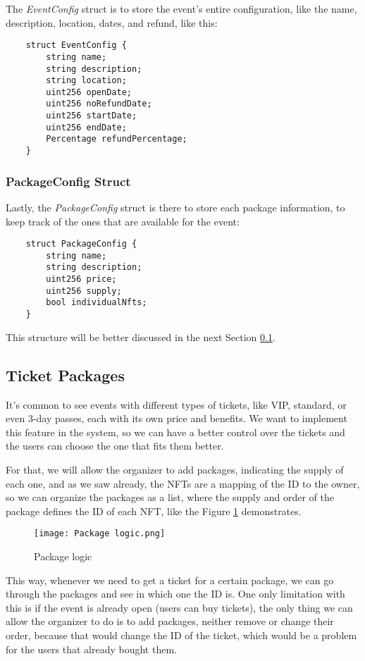 The \textit{EventConfig} struct is to store the event's entire configuration, like the name, description, location, dates, and refund, like this:
\begin{verbatim}
    struct EventConfig {
        string name;
        string description;
        string location;
        uint256 openDate;
        uint256 noRefundDate;
        uint256 startDate;
        uint256 endDate;
        Percentage refundPercentage;
    }
\end{verbatim}

\subsubsection{PackageConfig Struct}

Lastly, the \textit{PackageConfig} struct is there to store each package information, to keep track of the ones that are available for the event:
\begin{verbatim}
    struct PackageConfig {
        string name;
        string description;
        uint256 price;
        uint256 supply;
        bool individualNfts;
    }
\end{verbatim}
This structure will be better discussed in the next Section \ref{subsec:ticket_packages}.

\subsection{Ticket Packages}
\label{subsec:ticket_packages}

It's common to see events with different types of tickets, like VIP, standard, or even 3-day passes, each with its own price and benefits. We want to implement this feature in the system, so we can have a better control over the tickets and the users can choose the one that fits them better.

For that, we will allow the organizer to add packages, indicating the supply of each one, and as we saw already, the NFTs are a mapping of the ID to the owner, so we can organize the packages as a list, where the supply and order of the package defines the ID of each NFT, like the Figure \ref{fig:package_logic} demonstrates.

\begin{figure}[H]
    \texttt{[image: Package logic.png]}
    \centering
    \caption{Package logic}
    \label{fig:package_logic}
\end{figure}

This way, whenever we need to get a ticket for a certain package, we can go through the packages and see in which one the ID is. One only limitation with this is if the event is already open (users can buy tickets), the only thing we can allow the organizer to do is to add packages, neither remove or change their order, because that would change the ID of the ticket, which would be a problem for the users that already bought them.

